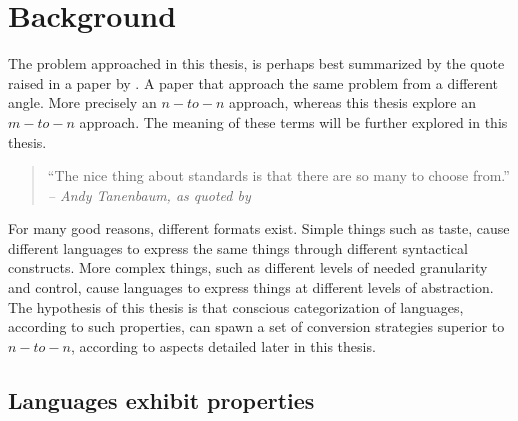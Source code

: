 \documentclass{scrreprt}
\begin{document}
%
%
%
%
%
%


\tableofcontents
\pagebreak











%
%
%
%
%
%










%
%
%
%
%
%

\chapter{Background}
The problem approached in this thesis, is perhaps best summarized by the quote raised in a paper by \citet{krijnen}. A paper that approach the same problem from a different angle. More precisely an $n-to-n$ approach, whereas this thesis explore an $m-to-n$ approach. The meaning of these terms will be further explored in this thesis.

\begin{quote}
``The nice thing about standards is that there are so many to choose from.''\\
\textit{-- Andy Tanenbaum, as quoted by \citet{krijnen}}
\end{quote}

For many good reasons, different formats exist. Simple things such as taste, cause different languages to express the same things through different syntactical constructs. More complex things, such as different levels of needed granularity and control, cause languages to express things at different levels of abstraction. The hypothesis of this thesis is that conscious categorization of languages, according to such properties, can spawn a set of conversion strategies superior to $n-to-n$, according to aspects detailed later in this thesis.

\section{Languages exhibit properties}
\end{document}
